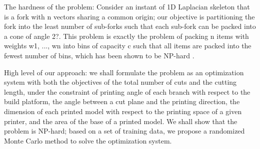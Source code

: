 The hardness of the problem: Consider an instant of 1D Laplacian skeleton that is a fork with n vectors sharing a common origin; our objective is partitioning the fork into the least number of sub-forks such that each sub-fork can be packed into a cone of angle 2?. This problem is exactly the problem of packing n items with weights w1, ..., wn into bins of capacity c such that all items are packed into the fewest number of bins, which has been shown to be NP-hard \cite{Fukunaga:2007}.

High level of our approach: we shall formulate the problem as an optimization system with both the objectives of the total number of cuts and the cutting length, under the constraint of printing angle of each branch with respect to the build platform, the angle between a cut plane and the printing direction, the dimension of each printed model with respect to the printing space of a given printer, and the area of the base of a printed model. We shall show that the problem is NP-hard; based on a set of training data, we propose a randomized Monte Carlo method to solve the optimization system.
